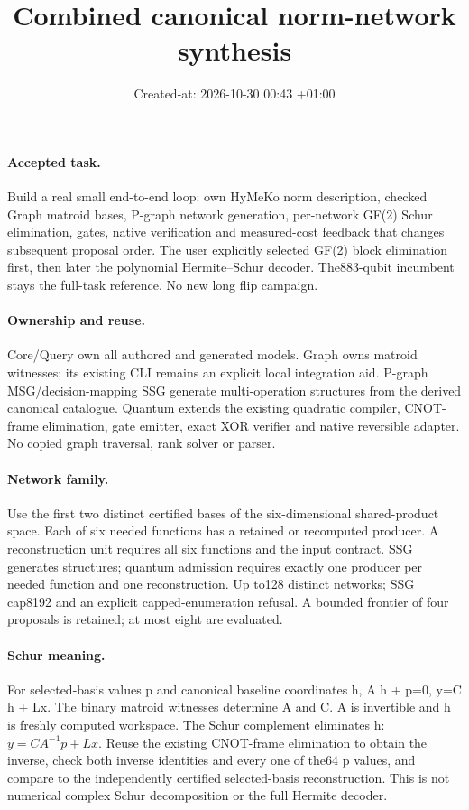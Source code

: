 \documentclass{article}
\title{Combined canonical norm-network synthesis}
\date{Created-at: 2026-10-30 00:43 +01:00}
\begin{document}
\maketitle
\paragraph{Accepted task.} Build a real small end-to-end loop: own HyMeKo norm
description, checked Graph matroid bases, P-graph network generation, per-network
GF(2) Schur elimination, gates, native verification and measured-cost feedback
that changes subsequent proposal order. The user explicitly selected GF(2)
block elimination first, then later the polynomial Hermite--Schur decoder.
The883-qubit incumbent stays the full-task reference. No new long flip campaign.
\paragraph{Ownership and reuse.} Core/Query own all authored and generated
models. Graph owns matroid witnesses; its existing CLI remains an explicit local
integration aid. P-graph MSG/decision-mapping SSG generate multi-operation
structures from the derived canonical catalogue. Quantum extends the existing
quadratic compiler, CNOT-frame elimination, gate emitter, exact XOR verifier and
native reversible adapter. No copied graph traversal, rank solver or parser.
\paragraph{Network family.} Use the first two distinct certified bases of the
six-dimensional shared-product space. Each of six needed functions has a retained
or recomputed producer. A reconstruction unit requires all six functions and the
input contract. SSG generates structures; quantum admission requires exactly one
producer per needed function and one reconstruction. Up to128 distinct networks;
SSG cap8192 and an explicit capped-enumeration refusal. A bounded frontier of
four proposals is retained; at most eight are evaluated.
\paragraph{Schur meaning.} For selected-basis values p and canonical baseline
coordinates h, A h + p=0, y=C h + Lx. The binary matroid witnesses determine A
and C. A is invertible and h is freshly computed workspace. The Schur complement
eliminates h: $y=C A^{-1}p+Lx$. Reuse the existing CNOT-frame elimination to obtain
the inverse, check both inverse identities and every one of the64 p values,
and compare to the independently certified selected-basis reconstruction.
This is not numerical complex Schur decomposition or the full Hermite decoder.
\end{document}

